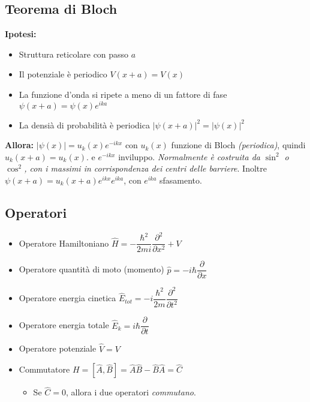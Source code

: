 \documentclass{article}
\begin{document}
\subsection{Teorema di Bloch}
\textbf{Ipotesi:}
\begin{itemize}
  \item Struttura reticolare con passo \( a \)
  \item Il potenziale è periodico \( V(x+a) = V(x) \)
  \item La funzione d'onda si ripete a meno di un fattore di fase \( \psi(x+a) = \psi(x) e^{ i k  a} \)
  \item La densià di probabilità è periodica \( \left| \psi(x+a) \right|^2 = \left| \psi(x)  \right|^2 \)
\end{itemize}
\textbf{Allora:} \( \left| \psi(x) \right| = u_k(x) e^{ -ikx } \) con \( u_k(x) \) funzione di Bloch \textit{(periodica)}, quindi \( u_k (x+a) = u_k(x).\) e \( e^{ -ikx } \) inviluppo. \newline \textit{Normalmente è costruita da \(\sin^2\) o \(\cos^2\), con i massimi in corrispondenza dei centri delle barriere}. \newline
Inoltre \( \psi(x+a) = u_k (x+a) e^{ikx} e^{ika} \), con \( e^{ika} \) sfasamento.

\subsection{Operatori}
\begin{itemize}
  \item Operatore Hamiltoniano \( \hat{H} = - \dfrac{\hbar ^ 2}{2mi} \dfrac{\partial ^ 2}{\partial x ^ 2} + V \)
  \item Operatore quantità di moto (momento) \( \hat{p} = -i \hbar \dfrac{\partial}{\partial x} \)
  \item Operatore energia cinetica \( \hat{E}_{tot} = -i \dfrac{\hbar ^ 2}{2m} \dfrac{\partial ^ 2}{\partial t ^ 2} \)
  \item Operatore energia totale \( \hat{E}_k = i \hbar \dfrac{\partial }{\partial t} \)
  \item Operatore potenziale \( \hat{V} = V \)
  \item Commutatore \( H = [\hat{A}, \hat{B}] = \hat{A}\hat{B} - \hat{B}\hat{A} = \hat{C} \)
        \begin{itemize}
          \item Se \( \hat{C} = 0 \), allora i due operatori \textit{commutano}.
        \end{itemize}
\end{itemize}
\end{document}

